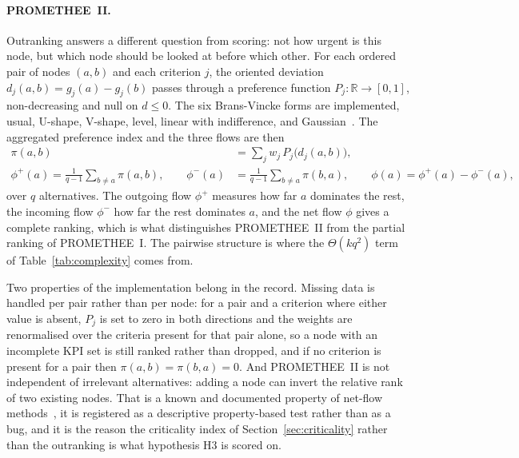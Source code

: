 \paragraph{PROMETHEE~II.}
Outranking answers a different question from scoring: not how urgent is this node, but which
node should be looked at before which other. For each ordered pair of nodes $(a,b)$ and each
criterion $j$, the oriented deviation $d_j(a,b) = g_j(a) - g_j(b)$ passes through a
preference function $P_j: \mathbb{R} \to [0,1]$, non-decreasing and null on $d \le 0$. The
six Brans-Vincke forms are implemented, usual, U-shape, V-shape, level, linear with
indifference, and Gaussian~\autocite{brans1986promethee}. The aggregated preference index and
the three flows are then
\begin{align}
    \pi(a,b) &= \sum_j w_j\, P_j\bigl(d_j(a,b)\bigr), \label{eq:promethee_pi} \\
    \phi^{+}(a) = \frac{1}{q-1}\sum_{b \ne a} \pi(a,b),
    \qquad
    \phi^{-}(a) &= \frac{1}{q-1}\sum_{b \ne a} \pi(b,a),
    \qquad
    \phi(a) = \phi^{+}(a) - \phi^{-}(a), \label{eq:promethee_flows}
\end{align}
over $q$ alternatives. The outgoing flow $\phi^{+}$ measures how far $a$ dominates the rest,
the incoming flow $\phi^{-}$ how far the rest dominates $a$, and the net flow $\phi$ gives a
complete ranking, which is what distinguishes PROMETHEE~II from the partial ranking of
PROMETHEE~I. The pairwise structure is where the $\Theta(k q^{2})$ term of
Table~\ref{tab:complexity} comes from.

Two properties of the implementation belong in the record. Missing data is handled per pair
rather than per node: for a pair and a criterion where either value is absent, $P_j$ is set
to zero in both directions and the weights are renormalised over the criteria present for
that pair alone, so a node with an incomplete KPI set is still ranked rather than dropped,
and if no criterion is present for a pair then $\pi(a,b) = \pi(b,a) = 0$. And PROMETHEE~II is
not independent of irrelevant alternatives: adding a node can invert the relative rank of two
existing nodes. That is a known and documented property of net-flow
methods~\autocite{triantaphyllou2000multi}, it is registered as a descriptive property-based test
rather than as a bug, and it is the reason the criticality index of
Section~\ref{sec:criticality} rather than the outranking is what hypothesis H3 is scored on.

